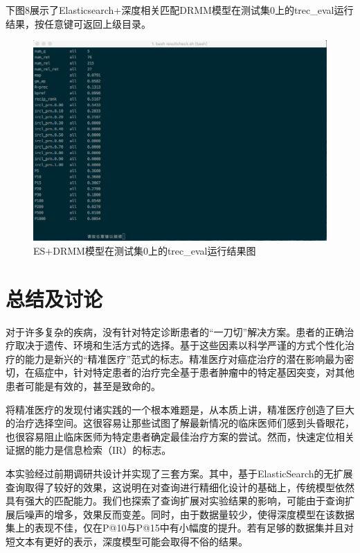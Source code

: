 \documentclass[a4paper]{article}
\begin{document}
\par 下图8展示了Elasticsearch+深度相关匹配DRMM模型在测试集0上的trec\_eval运行结果，按任意键可返回上级目录。
\begin{figure}[H]
	\centering
	\includegraphics[width=0.7\linewidth]{3}
	\caption{ES+DRMM模型在测试集0上的trec\_eval运行结果图}
	\label{fig:3}
\end{figure}


\pagebreak
\section{总结及讨论}

对于许多复杂的疾病，没有针对特定诊断患者的“一刀切”解决方案。患者的正确治疗取决于遗传、环境和生活方式的选择。基于这些因素以科学严谨的方式个性化治疗的能力是新兴的“精准医疗”范式的标志。精准医疗对癌症治疗的潜在影响最为密切，在癌症中，针对特定患者的治疗完全基于患者肿瘤中的特定基因突变，对其他患者可能是有效的，甚至是致命的。

将精准医疗的发现付诸实践的一个根本难题是，从本质上讲，精准医疗创造了巨大的治疗选择空间。这很容易让那些试图了解最新情况的临床医师们感到头昏眼花，也很容易阻止临床医师为特定患者确定最佳治疗方案的尝试。然而，快速定位相关证据的能力是信息检索（IR）的标志。

本实验经过前期调研共设计并实现了三套方案。其中，基于ElasticSearch的无扩展查询取得了较好的效果，这说明在对查询进行精细化设计的基础上，传统模型依然具有强大的匹配能力。我们也探索了查询扩展对实验结果的影响，可能由于查询扩展后噪声的增多，效果反而变差。同时，由于数据量较少，使得深度模型在该数据集上的表现不佳，仅在P@10与P@15中有小幅度的提升。若有足够的数据集并且对短文本有更好的表示，深度模型可能会取得不俗的结果。

\clearpage

\end{document}

